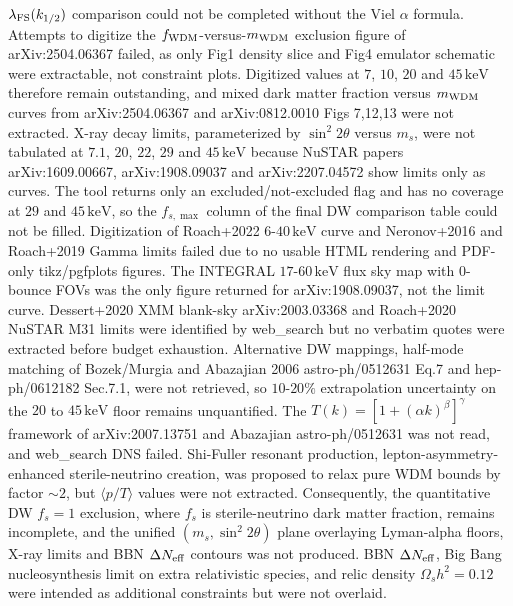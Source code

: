 \documentclass[11pt,a4paper]{article}
\begin{document}
$\lambda_{\rm FS}(k_{1/2})$ comparison could not be completed without the Viel $\alpha$ formula. Attempts to digitize the $f_{\rm WDM}$-versus-$m_{\rm WDM}$ exclusion figure of arXiv:2504.06367 failed, as only Fig1 density slice and Fig4 emulator schematic were extractable, not constraint plots. Digitized values at $7$, $10$, $20$ and $45\,\mathrm{keV}$ therefore remain outstanding, and mixed dark matter fraction versus $m_{\rm WDM}$ curves from arXiv:2504.06367 and arXiv:0812.0010 Figs 7,12,13 were not extracted. X-ray decay limits, parameterized by $\sin^2 2\theta$ versus $m_s$, were not tabulated at $7.1$, $20$, $22$, $29$ and $45\,\mathrm{keV}$ because NuSTAR papers arXiv:1609.00667, arXiv:1908.09037 and arXiv:2207.04572 show limits only as curves. The tool returns only an excluded/not-excluded flag and has no coverage at $29$ and $45\,\mathrm{keV}$, so the $f_{s,\max}$ column of the final DW comparison table could not be filled. Digitization of Roach+2022 $6$-$40\,\mathrm{keV}$ curve and Neronov+2016 and Roach+2019 Gamma limits failed due to no usable HTML rendering and PDF-only tikz/pgfplots figures. The INTEGRAL $17$-$60\,\mathrm{keV}$ flux sky map with 0-bounce FOVs was the only figure returned for arXiv:1908.09037, not the limit curve. Dessert+2020 XMM blank-sky arXiv:2003.03368 and Roach+2020 NuSTAR M31 limits were identified by web\_search but no verbatim quotes were extracted before budget exhaustion. Alternative DW mappings, half-mode matching of Bozek/Murgia and Abazajian 2006 astro-ph/0512631 Eq.7 and hep-ph/0612182 Sec.7.1, were not retrieved, so $10$-$20\%$ extrapolation uncertainty on the $20$ to $45\,\mathrm{keV}$ floor remains unquantified. The $T(k)=[1+(\alpha k)^{\beta}]^{\gamma}$ framework of arXiv:2007.13751 and Abazajian astro-ph/0512631 was not read, and web\_search DNS failed. Shi-Fuller resonant production, lepton-asymmetry-enhanced sterile-neutrino creation, was proposed to relax pure WDM bounds by factor $\sim 2$, but $\langle p/T \rangle$ values were not extracted. Consequently, the quantitative DW $f_s=1$ exclusion, where $f_s$ is sterile-neutrino dark matter fraction, remains incomplete, and the unified $(m_s, \sin^2 2\theta)$ plane overlaying Lyman-alpha floors, X-ray limits and BBN $\Delta N_{\rm eff}$ contours was not produced. BBN $\Delta N_{\rm eff}$, Big Bang nucleosynthesis limit on extra relativistic species, and relic density $\Omega_s h^2 = 0.12$ were intended as additional constraints but were not overlaid.
\end{document}
